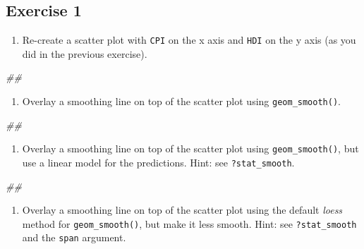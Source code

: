 \documentclass[]{book}
\newenvironment{Shaded}{\begin{snugshade}}{\end{snugshade}}
\newcommand{\CommentTok}[1]{\textcolor[rgb]{0.56,0.35,0.01}{\textit{#1}}}
\providecommand{\tightlist}{%
  \setlength{\itemsep}{0pt}\setlength{\parskip}{0pt}}
\begin{document}
\hypertarget{exercise-1-2}{%
\subsection{Exercise 1}\label{exercise-1-2}}

\begin{enumerate}
\def\labelenumi{\arabic{enumi}.}
\tightlist
\item
  Re-create a scatter plot with \texttt{CPI} on the x axis and \texttt{HDI} on the y axis (as you did in the previous exercise).
\end{enumerate}

\begin{Shaded}
\begin{Highlighting}[]
\CommentTok{## }
\end{Highlighting}
\end{Shaded}

\begin{enumerate}
\def\labelenumi{\arabic{enumi}.}
\setcounter{enumi}{1}
\tightlist
\item
  Overlay a smoothing line on top of the scatter plot using \texttt{geom\_smooth()}.
\end{enumerate}

\begin{Shaded}
\begin{Highlighting}[]
\CommentTok{## }
\end{Highlighting}
\end{Shaded}

\begin{enumerate}
\def\labelenumi{\arabic{enumi}.}
\setcounter{enumi}{2}
\tightlist
\item
  Overlay a smoothing line on top of the scatter plot using \texttt{geom\_smooth()}, but use a linear model for the predictions. Hint: see \texttt{?stat\_smooth}.
\end{enumerate}

\begin{Shaded}
\begin{Highlighting}[]
\CommentTok{## }
\end{Highlighting}
\end{Shaded}

\begin{enumerate}
\def\labelenumi{\arabic{enumi}.}
\setcounter{enumi}{3}
\tightlist
\item
  Overlay a smoothing line on top of the scatter plot using the default \emph{loess} method for \texttt{geom\_smooth()}, but make it less smooth. Hint: see \texttt{?stat\_smooth} and the \texttt{span} argument.
\end{enumerate}
\end{document}
